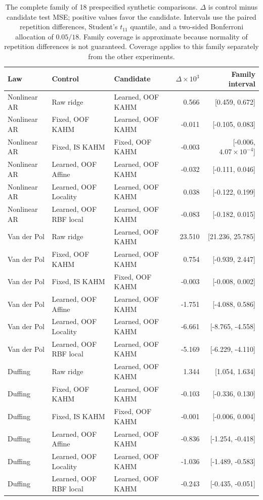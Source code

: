 \begin{table}[!htbp]
\centering\scriptsize\setlength{\tabcolsep}{4pt}
\caption{The complete family of 18 prespecified synthetic comparisons. $\Delta$ is control minus candidate test MSE; positive values favor the candidate. Intervals use the paired repetition differences, Student's $t_{11}$ quantile, and a two-sided Bonferroni allocation of $0.05/18$. Family coverage is approximate because normality of repetition differences is not guaranteed. Coverage applies to this family separately from the other experiments.}
\label{tab:target-synthetic-intervals}
\begin{tabular}{lllrr}
\toprule
Law & Control & Candidate & $\Delta\times10^3$ & Family interval \\
\midrule
Nonlinear AR & Raw ridge & Learned, OOF KAHM & 0.566 & [0.459, 0.672] \\
Nonlinear AR & Fixed, OOF KAHM & Learned, OOF KAHM & -0.011 & [-0.105, 0.083] \\
Nonlinear AR & Fixed, IS KAHM & Fixed, OOF KAHM & -0.003 & [-0.006, $4.07\times10^{-4}$] \\
Nonlinear AR & Learned, OOF Affine & Learned, OOF KAHM & -0.032 & [-0.111, 0.046] \\
Nonlinear AR & Learned, OOF Locality & Learned, OOF KAHM & 0.038 & [-0.122, 0.199] \\
Nonlinear AR & Learned, OOF RBF local & Learned, OOF KAHM & -0.083 & [-0.182, 0.015] \\
Van der Pol & Raw ridge & Learned, OOF KAHM & 23.510 & [21.236, 25.785] \\
Van der Pol & Fixed, OOF KAHM & Learned, OOF KAHM & 0.754 & [-0.939, 2.447] \\
Van der Pol & Fixed, IS KAHM & Fixed, OOF KAHM & -0.003 & [-0.008, 0.002] \\
Van der Pol & Learned, OOF Affine & Learned, OOF KAHM & -1.751 & [-4.088, 0.586] \\
Van der Pol & Learned, OOF Locality & Learned, OOF KAHM & -6.661 & [-8.765, -4.558] \\
Van der Pol & Learned, OOF RBF local & Learned, OOF KAHM & -5.169 & [-6.229, -4.110] \\
Duffing & Raw ridge & Learned, OOF KAHM & 1.344 & [1.054, 1.634] \\
Duffing & Fixed, OOF KAHM & Learned, OOF KAHM & -0.103 & [-0.336, 0.130] \\
Duffing & Fixed, IS KAHM & Fixed, OOF KAHM & -0.001 & [-0.006, 0.004] \\
Duffing & Learned, OOF Affine & Learned, OOF KAHM & -0.836 & [-1.254, -0.418] \\
Duffing & Learned, OOF Locality & Learned, OOF KAHM & -1.036 & [-1.489, -0.583] \\
Duffing & Learned, OOF RBF local & Learned, OOF KAHM & -0.243 & [-0.435, -0.051] \\
\bottomrule
\end{tabular}
\end{table}
